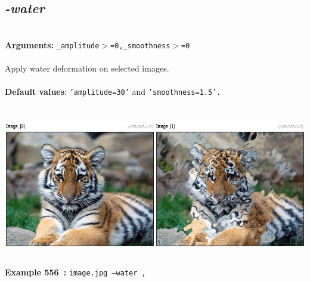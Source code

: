 \documentclass[a4paper,11pt,twoside]{book}
\begin{document}
\subsection{\emph{-water} }\vspace*{-0.5em}
~\\\textbf{Arguments: } 
{\small \texttt{\_amplitude$>$=0,\_smoothness$>$=0}}\\~\\
Apply water deformation on selected images.
~\\~\\\textbf{Default values}: {\small \texttt{'amplitude=30'} and \texttt{'smoothness=1.5'.}}
\begin{center}\includegraphics[keepaspectratio=true,height=7cm,width=\textwidth]{img/gmic_def556.jpg}\\
{\footnotesize \textbf{Example 556~:} \texttt{image.jpg --water ,}}
\end{center}
\end{document}
